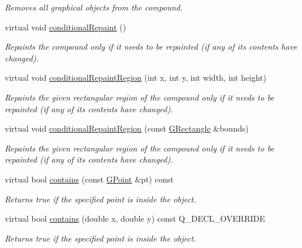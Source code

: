\begin{DoxyCompactItemize}
\begin{DoxyCompactList}\small\item\em Removes all graphical objects from the compound. \end{DoxyCompactList}\item 
virtual void \mbox{\hyperlink{classGCompound_a221b3e75bb3d9d0bfea62b3364e6773b}{conditional\+Repaint}} ()
\begin{DoxyCompactList}\small\item\em Repaints the compound only if it needs to be repainted (if any of its contents have changed). \end{DoxyCompactList}\item 
virtual void \mbox{\hyperlink{classGCompound_aedd4b792311d946eeaf44b0de337a408}{conditional\+Repaint\+Region}} (int x, int y, int width, int height)
\begin{DoxyCompactList}\small\item\em Repaints the given rectangular region of the compound only if it needs to be repainted (if any of its contents have changed). \end{DoxyCompactList}\item 
virtual void \mbox{\hyperlink{classGCompound_a3932a12278752db368e24fa404e446aa}{conditional\+Repaint\+Region}} (const \mbox{\hyperlink{classGRectangle}{G\+Rectangle}} \&bounds)
\begin{DoxyCompactList}\small\item\em Repaints the given rectangular region of the compound only if it needs to be repainted (if any of its contents have changed). \end{DoxyCompactList}\item 
virtual bool \mbox{\hyperlink{classGObject_a1dbc9dafaae51958112dbe1267a1f547}{contains}} (const \mbox{\hyperlink{classGPoint}{G\+Point}} \&pt) const
\begin{DoxyCompactList}\small\item\em Returns {\ttfamily true} if the specified point is inside the object. \end{DoxyCompactList}\item 
virtual bool \mbox{\hyperlink{classGCompound_aa095a031ab22c150d2d75fdda1c3c8f5}{contains}} (double x, double y) const Q\+\_\+\+D\+E\+C\+L\+\_\+\+O\+V\+E\+R\+R\+I\+DE
\begin{DoxyCompactList}\small\item\em Returns {\ttfamily true} if the specified point is inside the object. \end{DoxyCompactList}\item 

\end{DoxyCompactItemize}
